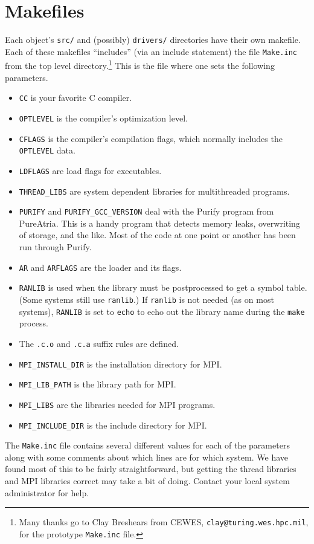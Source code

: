 \par
\section{Makefiles}
\par
Each object's {\tt src/} and (possibly) {\tt drivers/} directories
have their own makefile.
Each of these makefiles ``includes'' (via an include statement)
the file {\tt Make.inc} from the top level directory.\footnote{
Many thanks go to Clay Breshears from CEWES, 
{\tt clay@turing.wes.hpc.mil},
for the prototype {\tt Make.inc} file.
}
This is the file where one sets the following parameters.
\begin{itemize}
\item
{\tt CC} is your favorite C compiler.
\item
{\tt OPTLEVEL} is the compiler's optimization level.
\item
{\tt CFLAGS} is the compiler's compilation flags,
which normally includes the {\tt OPTLEVEL} data.
\item
{\tt LDFLAGS} are load flags for executables.
\item
{\tt THREAD\_LIBS} are system dependent libraries for multithreaded
programs.
\item
{\tt PURIFY} and {\tt PURIFY\_GCC\_VERSION} deal with the Purify
program from PureAtria.
This is a handy program that detects memory leaks, overwriting of
storage, and the like.
Most of the code at one point or another has been run through
Purify.
\item
{\tt AR} and {\tt ARFLAGS} are the loader and its flags.
\item
{\tt RANLIB} is used when the library must be postprocessed to get
a symbol table.
(Some systems still use {\tt ranlib}.)
If {\tt ranlib} is not needed (as on most systems), {\tt RANLIB} is
set to {\tt echo} to echo out the library name
during the {\tt make} process.
\item
The {\tt .c.o} and {\tt .c.a} suffix rules are defined.
\item
{\tt MPI\_INSTALL\_DIR} is the installation directory for MPI.
\item
{\tt MPI\_LIB\_PATH} is the library path for MPI.
\item
{\tt MPI\_LIBS} are the libraries needed for MPI programs.
\item
{\tt MPI\_INCLUDE\_DIR} is the include directory for MPI.
\end{itemize}
The {\tt Make.inc} file contains several different values for each
of the parameters along with some comments about which lines are
for which system.
We have found most of this to be fairly straightforward, but
getting the thread libraries and MPI libraries correct may take a
bit of doing. Contact your local system administrator for help.
\par

